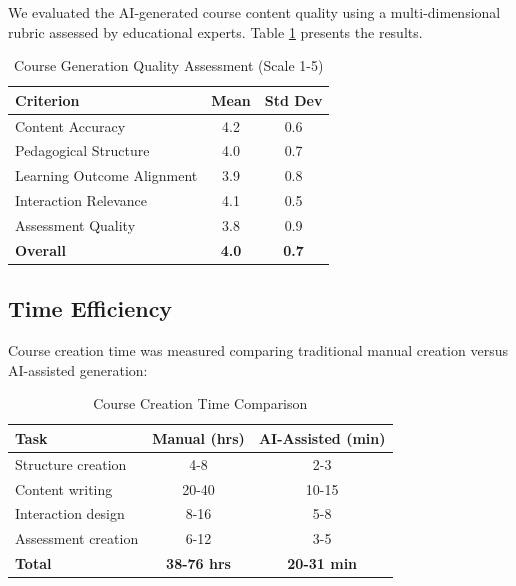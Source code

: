 \documentclass[conference]{IEEEtran}
\begin{document}
We evaluated the AI-generated course content quality using a multi-dimensional rubric assessed by educational experts. Table \ref{tab:quality} presents the results.

\begin{table}[htbp]
\caption{Course Generation Quality Assessment (Scale 1-5)}
\begin{center}
\begin{tabular}{|l|c|c|}
\hline
\textbf{Criterion} & \textbf{Mean} & \textbf{Std Dev} \\
\hline
Content Accuracy & 4.2 & 0.6 \\
Pedagogical Structure & 4.0 & 0.7 \\
Learning Outcome Alignment & 3.9 & 0.8 \\
Interaction Relevance & 4.1 & 0.5 \\
Assessment Quality & 3.8 & 0.9 \\
\hline
\textbf{Overall} & \textbf{4.0} & \textbf{0.7} \\
\hline
\end{tabular}
\label{tab:quality}
\end{center}
\end{table}

\subsection{Time Efficiency}

Course creation time was measured comparing traditional manual creation versus AI-assisted generation:

\begin{table}[htbp]
\caption{Course Creation Time Comparison}
\begin{center}
\begin{tabular}{|l|c|c|}
\hline
\textbf{Task} & \textbf{Manual (hrs)} & \textbf{AI-Assisted (min)} \\
\hline
Structure creation & 4-8 & 2-3 \\
Content writing & 20-40 & 10-15 \\
Interaction design & 8-16 & 5-8 \\
Assessment creation & 6-12 & 3-5 \\
\hline
\textbf{Total} & \textbf{38-76 hrs} & \textbf{20-31 min} \\
\hline
\end{tabular}
\label{tab:time}
\end{center}
\end{table}
\end{document}
